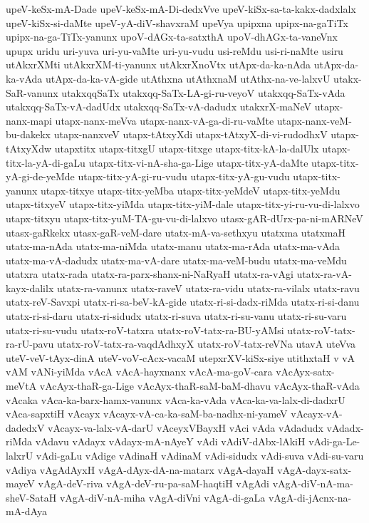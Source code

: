 {upeV-keSx-mA-Dade
upeV-keSx-mA-Di-dedxVve
upeV-kiSx-sa-ta-kakx-dadxlalx
upeV-kiSx-si-daMte
upeV-yA-diV-shavxraM
upeVya
upipxna
upipx-na-gaTiTx
upipx-na-ga-TiTx-yanunx
upoV-dAGx-ta-satxthA
upoV-dhAGx-ta-vaneVnx
upupx
uridu
uri-yuva
uri-yu-vaMte
uri-yu-vudu
usi-reMdu
usi-ri-naMte
usiru
utAkxrXMti
utAkxrXM-ti-yanunx
utAkxrXnoVtx
utApx-da-ka-nAda
utApx-da-ka-vAda
utApx-da-ka-vA-gide
utAthxna
utAthxnaM
utAthx-na-ve-lalxvU
utakx-SaR-vanunx
utakxqqSaTx
utakxqq-SaTx-LA-gi-ru-veyoV
utakxqq-SaTx-vAda
utakxqq-SaTx-vA-dadUdx
utakxqq-SaTx-vA-dadudx
utakxrX-maNeV
utapx-nanx-mapi
utapx-nanx-meVva
utapx-nanx-vA-ga-di-ru-vaMte
utapx-nanx-veM-bu-dakekx
utapx-nanxveV
utapx-tAtxyXdi
utapx-tAtxyX-di-vi-rudodhxV
utapx-tAtxyXdw
utapxtitx
utapx-titxgU
utapx-titxge
utapx-titx-kA-la-dalUlx
utapx-titx-la-yA-di-gaLu
utapx-titx-vi-nA-sha-ga-Lige
utapx-titx-yA-daMte
utapx-titx-yA-gi-de-yeMde
utapx-titx-yA-gi-ru-vudu
utapx-titx-yA-gu-vudu
utapx-titx-yanunx
utapx-titxye
utapx-titx-yeMba
utapx-titx-yeMdeV
utapx-titx-yeMdu
utapx-titxyeV
utapx-titx-yiMda
utapx-titx-yiM-dale
utapx-titx-yi-ru-vu-di-lalxvo
utapx-titxyu
utapx-titx-yuM-TA-gu-vu-di-lalxvo
utasx-gAR-dUrx-pa-ni-mARNeV
utasx-gaRkekx
utasx-gaR-veM-dare
utatx-mA-va-sethxyu
utatxma
utatxmaH
utatx-ma-nAda
utatx-ma-niMda
utatx-manu
utatx-ma-rAda
utatx-ma-vAda
utatx-ma-vA-dadudx
utatx-ma-vA-dare
utatx-ma-veM-budu
utatx-ma-veMdu
utatxra
utatx-rada
utatx-ra-parx-shanx-ni-NaRyaH
utatx-ra-vAgi
utatx-ra-vA-kayx-dalilx
utatx-ra-vanunx
utatx-raveV
utatx-ra-vidu
utatx-ra-vilalx
utatx-ravu
utatx-reV-Savxpi
utatx-ri-sa-beV-kA-gide
utatx-ri-si-dadx-riMda
utatx-ri-si-danu
utatx-ri-si-daru
utatx-ri-sidudx
utatx-ri-suva
utatx-ri-su-vanu
utatx-ri-su-varu
utatx-ri-su-vudu
utatx-roV-tatxra
utatx-roV-tatx-ra-BU-yAMsi
utatx-roV-tatx-ra-rU-pavu
utatx-roV-tatx-ra-vaqdAdhxyX
utatx-roV-tatx-reVNa
utavA
uteVva
uteV-veV-tAyx-dinA
uteV-voV-cAcx-vacaM
utepxrXV-kiSx-siye
utithxtaH
v
vA
vAM
vANi-yiMda
vAcA
vAcA-hayxnanx
vAcA-ma-goV-cara
vAcAyx-satx-meVtA
vAcAyx-thaR-ga-Lige
vAcAyx-thaR-saM-baM-dhavu
vAcAyx-thaR-vAda
vAcaka
vAca-ka-barx-hamx-vanunx
vAca-ka-vAda
vAca-ka-va-lalx-di-dadxrU
vAca-sapxtiH
vAcayx
vAcayx-vA-ca-ka-saM-ba-nadhx-ni-yameV
vAcayx-vA-dadedxV
vAcayx-va-lalx-vA-darU
vAceyxVBayxH
vAci
vAda
vAdadudx
vAdadx-riMda
vAdavu
vAdayx
vAdayx-mA-nAyeY
vAdi
vAdiV-dAbx-lAkiH
vAdi-ga-Le-lalxrU
vAdi-gaLu
vAdige
vAdinaH
vAdinaM
vAdi-sidudx
vAdi-suva
vAdi-su-varu
vAdiya
vAgAdAyxH
vAgA-dAyx-dA-na-matarx
vAgA-dayaH
vAgA-dayx-satx-mayeV
vAgA-deV-riva
vAgA-deV-ru-pa-saM-haqtiH
vAgAdi
vAgA-diV-nA-ma-sheV-SataH
vAgA-diV-nA-miha
vAgA-diVni
vAgA-di-gaLa
vAgA-di-jAcnx-na-mA-dAya
}
